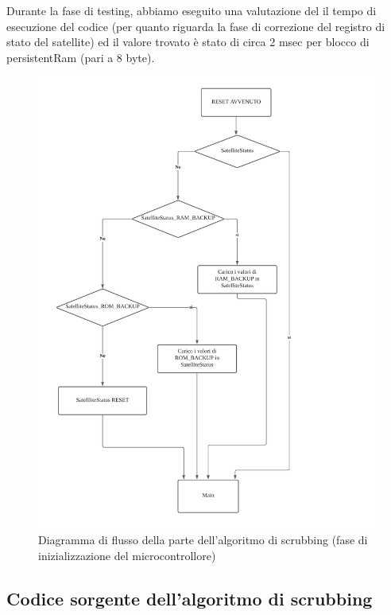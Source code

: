 \documentclass[LaM,binding=0.6cm]{../sapthesis}
\begin{document}
Durante la fase di testing, abbiamo eseguito una valutazione del il tempo di esecuzione del codice (per quanto riguarda la fase di correzione del registro di stato del satellite) ed il valore trovato è stato di circa 2 msec per blocco di persistentRam (pari a 8 byte).


\begin{figure}[htbp]
\centerline{\includegraphics[scale=0.33]{examples/DiagrammaFlussoScrubbing.jpeg}}
\caption{Diagramma di flusso della parte dell'algoritmo di scrubbing (fase di inizializzazione del microcontrollore)}
\label{fig}
\end{figure}


\subsection{Codice sorgente dell'algoritmo di scrubbing}
\end{document}
